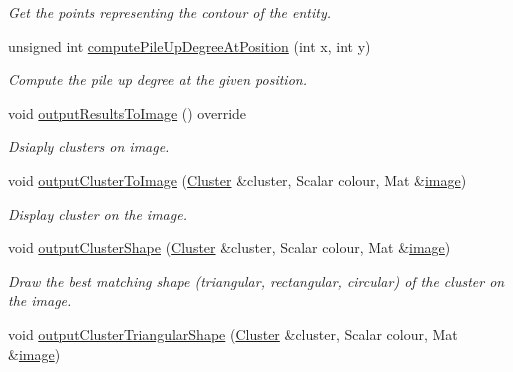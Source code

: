 \begin{DoxyCompactItemize}
\begin{DoxyCompactList}\small\item\em Get the points representing the contour of the entity. \end{DoxyCompactList}\item 
unsigned int \hyperlink{classmultiscale_1_1analysis_1_1SimulationClusterDetector_a2252829af367a55af95bee3cf814b87e}{compute\-Pile\-Up\-Degree\-At\-Position} (int x, int y)
\begin{DoxyCompactList}\small\item\em Compute the pile up degree at the given position. \end{DoxyCompactList}\item 
void \hyperlink{classmultiscale_1_1analysis_1_1SimulationClusterDetector_a909e1e53836f1688ebe312c5f7fb70b5}{output\-Results\-To\-Image} () override
\begin{DoxyCompactList}\small\item\em Dsiaply clusters on image. \end{DoxyCompactList}\item 
void \hyperlink{classmultiscale_1_1analysis_1_1SimulationClusterDetector_a0e29be5f9a15899f710f48aaf6c049f0}{output\-Cluster\-To\-Image} (\hyperlink{classmultiscale_1_1analysis_1_1Cluster}{Cluster} \&cluster, Scalar colour, Mat \&\hyperlink{classmultiscale_1_1analysis_1_1Detector_a523830a6cfe409694ce8327c3c736fbd}{image})
\begin{DoxyCompactList}\small\item\em Display cluster on the image. \end{DoxyCompactList}\item 
void \hyperlink{classmultiscale_1_1analysis_1_1SimulationClusterDetector_a8dc451d799404ba7ecd72d85d2f7e955}{output\-Cluster\-Shape} (\hyperlink{classmultiscale_1_1analysis_1_1Cluster}{Cluster} \&cluster, Scalar colour, Mat \&\hyperlink{classmultiscale_1_1analysis_1_1Detector_a523830a6cfe409694ce8327c3c736fbd}{image})
\begin{DoxyCompactList}\small\item\em Draw the best matching shape (triangular, rectangular, circular) of the cluster on the image. \end{DoxyCompactList}\item 
void \hyperlink{classmultiscale_1_1analysis_1_1SimulationClusterDetector_a9894288a54c8e3fdeff3917d81e2ad9b}{output\-Cluster\-Triangular\-Shape} (\hyperlink{classmultiscale_1_1analysis_1_1Cluster}{Cluster} \&cluster, Scalar colour, Mat \&\hyperlink{classmultiscale_1_1analysis_1_1Detector_a523830a6cfe409694ce8327c3c736fbd}{image})

\end{DoxyCompactItemize}
